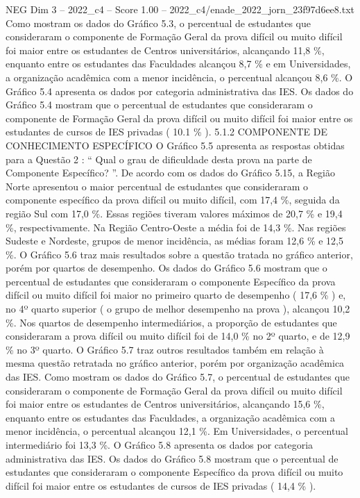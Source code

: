 \begin{textsample}{NEG Dim 3 – 2022\_c4 – Score 1.00 – 2022\_c4/enade\_2022\_jorn\_23f97d6ee8.txt}
Como mostram os dados do Gráfico 5.3, o percentual de estudantes que consideraram o componente de Formação Geral da prova difícil ou muito difícil foi maior entre os estudantes de Centros universitários, alcançando 11,8 \%, enquanto entre os estudantes das Faculdades alcançou 8,7 \% e em Universidades, a organização acadêmica com a menor incidência, o percentual alcançou 8,6 \%.
O Gráfico 5.4 apresenta os dados por categoria administrativa das IES.
Os dados do Gráfico 5.4 mostram que o percentual de estudantes que consideraram o componente de Formação Geral da prova difícil ou muito difícil foi maior entre os estudantes de cursos de IES privadas ( 10.1 \% ). 5.1.2 COMPONENTE DE CONHECIMENTO ESPECÍFICO O Gráfico 5.5 apresenta as respostas obtidas para a Questão 2 : “ Qual o grau de dificuldade desta prova na parte de Componente Específico? ”.
De acordo com os dados do Gráfico 5.15, a Região Norte apresentou o maior percentual de estudantes que consideraram o componente específico da prova difícil ou muito difícil, com 17,4 \%, seguida da região Sul com 17,0 \%.
Essas regiões tiveram valores máximos de 20,7 \% e 19,4 \%, respectivamente.
Na Região Centro-Oeste a média foi de 14,3 \%.
Nas regiões Sudeste e Nordeste, grupos de menor incidência, as médias foram 12,6 \% e 12,5 \%.
O Gráfico 5.6 traz mais resultados sobre a questão tratada no gráfico anterior, porém por quartos de desempenho.
Os dados do Gráfico 5.6 mostram que o percentual de estudantes que consideraram o componente Específico da prova difícil ou muito difícil foi maior no primeiro quarto de desempenho ( 17,6 \% ) e, no 4º quarto superior ( o grupo de melhor desempenho na prova ), alcançou 10,2 \%.
Nos quartos de desempenho intermediários, a proporção de estudantes que consideraram a prova difícil ou muito difícil foi de 14,0 \% no 2º quarto, e de 12,9 \% no 3º quarto.
O Gráfico 5.7 traz outros resultados também em relação à mesma questão retratada no gráfico anterior, porém por organização acadêmica das IES.
Como mostram os dados do Gráfico 5.7, o percentual de estudantes que consideraram o componente de Formação Geral da prova difícil ou muito difícil foi maior entre os estudantes de Centros universitários, alcançando 15,6 \%, enquanto entre os estudantes das Faculdades, a organização acadêmica com a menor incidência, o percentual alcançou 12,1 \%.
Em Universidades, o percentual intermediário foi 13,3 \%.
O Gráfico 5.8 apresenta os dados por categoria administrativa das IES.
Os dados do Gráfico 5.8 mostram que o percentual de estudantes que consideraram o componente Específico da prova difícil ou muito difícil foi maior entre os estudantes de cursos de IES privadas ( 14,4 \% ).

\end{textsample}
